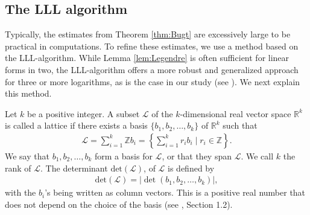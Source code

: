 \documentclass[11pt,a4paper]{article}
\numberwithin{equation}{section}
\numberwithin{table}{section}
\numberwithin{figure}{section}
\begin{document}
\subsection{The LLL algorithm}

Typically, the estimates from Theorem \ref{thm:Bugt} are excessively large to be practical in computations. To refine these estimates, we use a method based on the LLL-algorithm. While Lemma \ref{lem:Legendre} is often sufficient for linear forms in two, the LLL-algorithm offers a more robust and generalized approach for three or more logarithms, as is the case in our study (see \cite{SMA, Weg}). We next explain this method.

Let $k$ be a positive integer. A subset $\mathcal{L}$ of the $k$-dimensional real vector space ${ \mathbb{R}^k}$ is called a lattice if there exists a basis $\{b_1, b_2, \ldots, b_k \}$ of $\mathbb{R}^k$ such that
\begin{align*}
	\mathcal{L} = \sum_{i=1}^{k} \mathbb{Z} b_i = \left\{ \sum_{i=1}^{k} r_i b_i \mid r_i \in \mathbb{Z} \right\}.
\end{align*}
We say that $b_1, b_2, \ldots, b_k$ form a basis for $\mathcal{L}$, or that they span $\mathcal{L}$. We
call $k$ the rank of $ \mathcal{L}$. The determinant $\text{det}(\mathcal{L})$, of $\mathcal{L}$ is defined by
\begin{align*}
	\text{det}(\mathcal{L}) = | \det(b_1, b_2, \ldots, b_k) |,
\end{align*}
with the $b_i$'s being written as column vectors. This is a positive real number that does not depend on the choice of the basis (see \cite{Cas}, Section 1.2).
\end{document}
